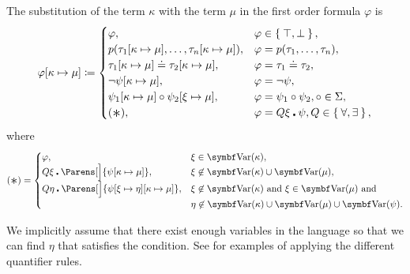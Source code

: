 \begin{definition}
\begin{DefEnum}
     The substitution of the term \( \kappa \) with the term \( \mu \) in the first order formula \( \varphi \) is
    \begin{equation}\label{eq:def:first_order_substitution/term_in_formula}
      \varphi[\kappa \mapsto \mu] \coloneqq \begin{cases}
        \varphi,                                                           &\varphi \in \Set{ \top, \bot }, \\
        p(\tau_1[\kappa \mapsto \mu], \ldots, \tau_n[\kappa \mapsto \mu]), &\varphi = p(\tau_1, \ldots, \tau_n), \\
        \tau_1[\kappa \mapsto \mu] \doteq \tau_2[\kappa \mapsto \mu],      &\varphi = \tau_1 \doteq \tau_2, \\
        \neg \psi[\kappa \mapsto \mu],                                     &\varphi = \neg \psi, \\
        \psi_1[\kappa \mapsto \mu] \circ \psi_2[\xi \mapsto \mu],          &\varphi = \psi_1 \circ \psi_2, \circ \in \Sigma, \\
        (\Ast),                                                            &\varphi = Q \xi \centerdot \psi, Q \in \Set{ \forall, \exists },
      \end{cases}
    \end{equation}
    where
    \begin{equation}\label{eq:def:first_order_substitution/term_in_formula/quantifiers}
      (\Ast) = \begin{cases}
        \varphi,                                                                     &\xi \in \Bold{Var}(\kappa), \\
        Q \xi \centerdot \Parens[\Big]{\psi[\kappa \mapsto \mu]},                    &\xi \not\in \Bold{Var}(\kappa) \cup \Bold{Var}(\mu), \\
        Q \eta \centerdot \Parens[\Big]{\psi[\xi \mapsto \eta][\kappa \mapsto \mu]}, &\xi \not\in \Bold{Var}(\kappa) \T{and} \xi \in \Bold{Var}(\mu) \T{and} \\
                                                                                     &\eta \not\in \Bold{Var}(\kappa) \cup \Bold{Var}(\mu) \cup \Bold{Var}(\psi).
      \end{cases}
    \end{equation}

    We implicitly assume that there exist enough variables in the language so that we can find \( \eta \) that satisfies the condition. See  for examples of applying the different quantifier rules.


\end{DefEnum}
\end{definition}
